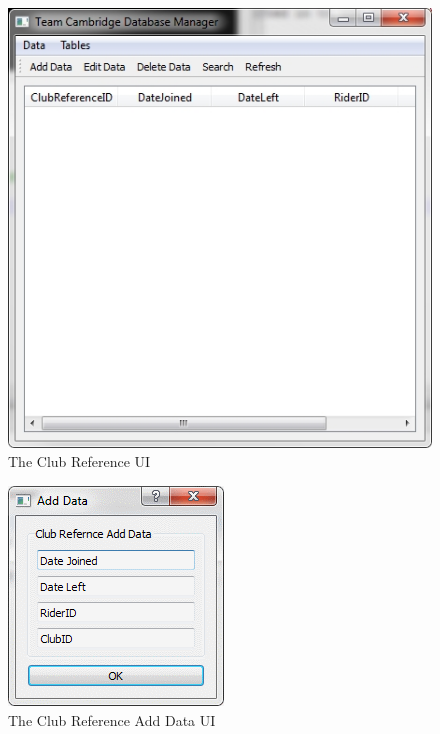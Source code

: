 \begin{figure}
\includegraphics[width=\textwidth]{./Maintenance/UI/ClubRef.png}
\caption{The Club Reference UI} \label{fig:ClubRef_UI}
\end{figure}

\begin{figure}
\includegraphics[width=\textwidth]{./Maintenance/UI/ClubRefAD.png}
\caption{The Club Reference Add Data UI} \label{fig:ClubRefAD_UI}
\end{figure}

